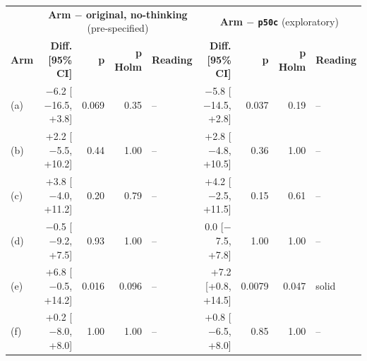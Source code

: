 \begin{tabular}{lrrrlrrrl}
\toprule
& \multicolumn{4}{c}{\textbf{Arm $-$ original, no-thinking} (pre-specified)} & \multicolumn{4}{c}{\textbf{Arm $-$ \texttt{p50c}} (exploratory)} \\
\cmidrule(lr){2-5}\cmidrule(lr){6-9}
\textbf{Arm} & \textbf{Diff. [95\% CI]} & \textbf{p} & \textbf{p Holm} & \textbf{Reading} & \textbf{Diff. [95\% CI]} & \textbf{p} & \textbf{p Holm} & \textbf{Reading} \\
\midrule
(a) & $-$6.2 [$-$16.5, +3.8] & 0.069 & 0.35 & -- & $-$5.8 [$-$14.5, +2.8] & 0.037 & 0.19 & -- \\
(b) & +2.2 [$-$5.5, +10.2] & 0.44 & 1.00 & -- & +2.8 [$-$4.8, +10.5] & 0.36 & 1.00 & -- \\
(c) & +3.8 [$-$4.0, +11.2] & 0.20 & 0.79 & -- & +4.2 [$-$2.5, +11.5] & 0.15 & 0.61 & -- \\
(d) & $-$0.5 [$-$9.2, +7.5] & 0.93 & 1.00 & -- & 0.0 [$-$7.5, +7.8] & 1.00 & 1.00 & -- \\
(e) & +6.8 [$-$0.5, +14.2] & 0.016 & 0.096 & -- & +7.2 [+0.8, +14.5] & 0.0079 & 0.047 & solid \\
(f) & +0.2 [$-$8.0, +8.0] & 1.00 & 1.00 & -- & +0.8 [$-$6.5, +8.0] & 0.85 & 1.00 & -- \\
\bottomrule
\end{tabular}
